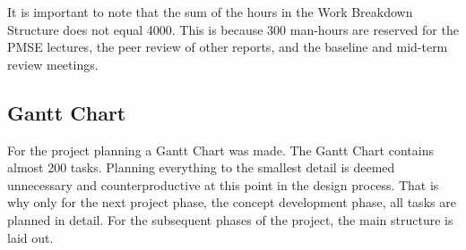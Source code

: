 It is important to note that the sum of the hours in the Work Breakdown Structure does not equal 4000. This is because 300 man-hours are reserved for the PMSE lectures, the peer review of other reports, and the baseline and mid-term review meetings.

\subsection{Gantt Chart}\label{sec:gantt-chart}
For the project planning a Gantt Chart was made. The Gantt Chart contains almost 200 tasks. Planning everything to the smallest detail is deemed unnecessary and counterproductive at this point in the design process. That is why only for the next project phase, the concept development phase, all tasks are planned in detail. For the subsequent phases of the project, the main structure is laid out. 

\recalctypearea
